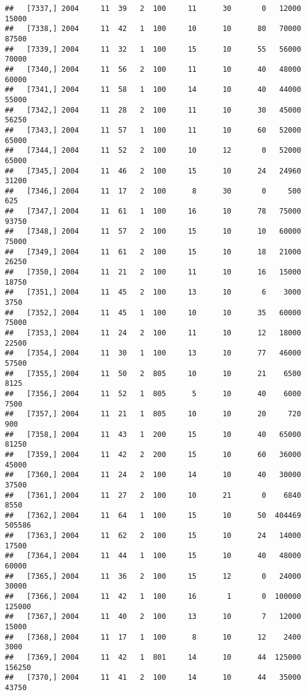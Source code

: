 \documentclass{article}\usepackage[]{graphicx}\usepackage[]{color}
\makeatletter
\newenvironment{kframe}{%
 \def\at@end@of@kframe{}%
 \ifinner\ifhmode%
  \def\at@end@of@kframe{\end{minipage}}%
  \begin{minipage}{\columnwidth}%
 \fi\fi%
 \def\FrameCommand##1{\hskip\@totalleftmargin \hskip-\fboxsep
 \colorbox{shadecolor}{##1}\hskip-\fboxsep
     \hskip-\linewidth \hskip-\@totalleftmargin \hskip\columnwidth}%
 \MakeFramed {\advance\hsize-\width
   \@totalleftmargin\z@ \linewidth\hsize
   \@setminipage}}%
 {\par\unskip\endMakeFramed%
 \at@end@of@kframe}
\newenvironment{knitrout}{}{} %
\makeatother
\begin{document}
\begin{knitrout}
\begin{kframe}
\begin{verbatim}
##   [7337,] 2004     11  39   2  100     11      30       0   12000   15000
##   [7338,] 2004     11  42   1  100     10      10      80   70000   87500
##   [7339,] 2004     11  32   1  100     15      10      55   56000   70000
##   [7340,] 2004     11  56   2  100     11      10      40   48000   60000
##   [7341,] 2004     11  58   1  100     14      10      40   44000   55000
##   [7342,] 2004     11  28   2  100     11      10      30   45000   56250
##   [7343,] 2004     11  57   1  100     11      10      60   52000   65000
##   [7344,] 2004     11  52   2  100     10      12       0   52000   65000
##   [7345,] 2004     11  46   2  100     15      10      24   24960   31200
##   [7346,] 2004     11  17   2  100      8      30       0     500     625
##   [7347,] 2004     11  61   1  100     16      10      78   75000   93750
##   [7348,] 2004     11  57   2  100     15      10      10   60000   75000
##   [7349,] 2004     11  61   2  100     15      10      18   21000   26250
##   [7350,] 2004     11  21   2  100     11      10      16   15000   18750
##   [7351,] 2004     11  45   2  100     13      10       6    3000    3750
##   [7352,] 2004     11  45   1  100     10      10      35   60000   75000
##   [7353,] 2004     11  24   2  100     11      10      12   18000   22500
##   [7354,] 2004     11  30   1  100     13      10      77   46000   57500
##   [7355,] 2004     11  50   2  805     10      10      21    6500    8125
##   [7356,] 2004     11  52   1  805      5      10      40    6000    7500
##   [7357,] 2004     11  21   1  805     10      10      20     720     900
##   [7358,] 2004     11  43   1  200     15      10      40   65000   81250
##   [7359,] 2004     11  42   2  200     15      10      60   36000   45000
##   [7360,] 2004     11  24   2  100     14      10      40   30000   37500
##   [7361,] 2004     11  27   2  100     10      21       0    6840    8550
##   [7362,] 2004     11  64   1  100     15      10      50  404469  505586
##   [7363,] 2004     11  62   2  100     15      10      24   14000   17500
##   [7364,] 2004     11  44   1  100     15      10      40   48000   60000
##   [7365,] 2004     11  36   2  100     15      12       0   24000   30000
##   [7366,] 2004     11  42   1  100     16       1       0  100000  125000
##   [7367,] 2004     11  40   2  100     13      10       7   12000   15000
##   [7368,] 2004     11  17   1  100      8      10      12    2400    3000
##   [7369,] 2004     11  42   1  801     14      10      44  125000  156250
##   [7370,] 2004     11  41   2  100     14      10      44   35000   43750

\end{verbatim}
\end{kframe}
\end{knitrout}
\end{document}
